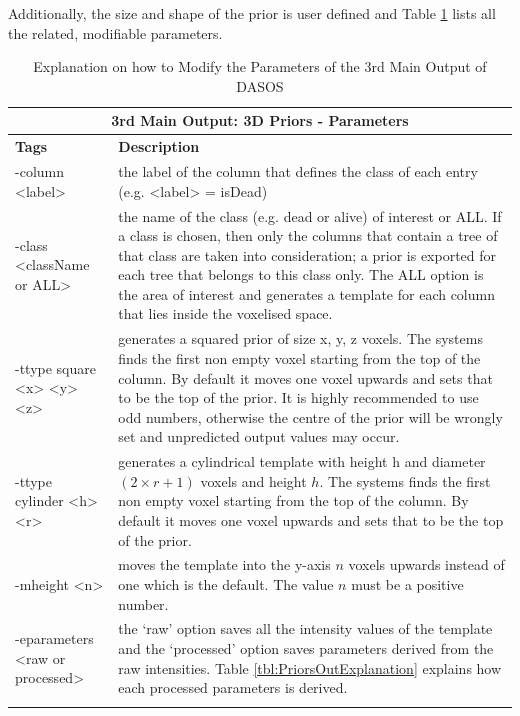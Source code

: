 \documentclass{article}
\begin{document}
		\par Additionally, the size and shape of the prior is user defined and Table \ref{tbl:PriorsParameters} lists all the related, modifiable parameters.
		
					\newpage
			\begin{longtable}
				{|p{3.1cm}|p{11cm}|}
				
				\toprule
				\multicolumn{2}{|c|}{\textbf{3rd Main Output: 3D Priors - Parameters }} \\
				\midrule
				
				\textbf{Tags} & \textbf{Description} \\ 
				\cmidrule(r){1-1}\cmidrule(l){2-2}
				-column <label> & the label of the column that defines the class of each entry (e.g. <label> = isDead) \\
				\cmidrule(r){1-1}\cmidrule(l){2-2}
				-class <className or ALL> & the name of the class (e.g. dead or alive) of interest or ALL. If a class is chosen, then only the columns that contain a tree of that class are taken into consideration; a prior is exported for each tree that belongs to this class only. The ALL option is the area of interest and generates a template for each column that lies inside the voxelised space. \\
				
				\cmidrule(r){1-1}\cmidrule(l){2-2}
				-ttype  square <x> <y> <z> & generates a squared prior of size x, y, z voxels. The systems finds the first non empty voxel starting from the top of the column. By default it moves one voxel upwards and sets that to be the top of the prior. It is highly recommended to use odd numbers, otherwise the centre of the prior will be wrongly set and unpredicted output values may occur. 		\\		
				\cmidrule(r){1-1}\cmidrule(l){2-2}
				-ttype cylinder <h> <r> & generates a cylindrical template with height h and diameter $(2 \times r + 1)$ voxels and height $h$. The systems finds the first non empty voxel starting from the top of the column. By default it moves one voxel upwards and sets that to be the top of the prior. \\
				\cmidrule(r){1-1}\cmidrule(l){2-2}
				-mheight <n> & moves the template into the y-axis $n$ voxels upwards instead of one which is the default. The value $n$ must be a positive number.\\
				\cmidrule(r){1-1}\cmidrule(l){2-2}
				-eparameters <raw or processed> & the ‘raw’ option saves all the intensity values of the template and the ‘processed’ option saves parameters derived from the raw intensities. Table \ref{tbl:PriorsOutExplanation} explains how each processed parameters is derived. \\
				\bottomrule
				\caption[DASOS's functionalities]{Explanation on how to Modify the Parameters of the 3rd Main Output of DASOS}
				\label{tbl:PriorsParameters}	
			\end{longtable}
			
\end{document}
